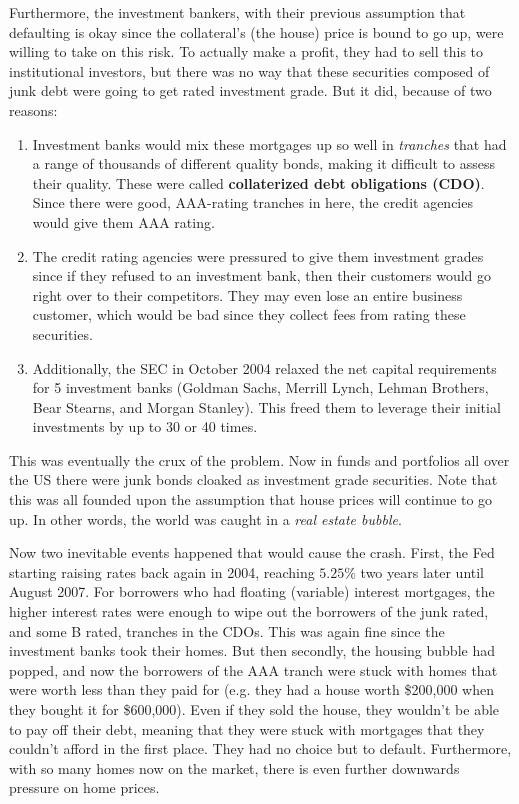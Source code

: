 \documentclass{article}
\begin{document}
  Furthermore, the investment bankers, with their previous assumption that defaulting is okay since the collateral's (the house) price is bound to go up, were willing to take on this risk. To actually make a profit, they had to sell this to institutional investors, but there was no way that these securities composed of junk debt were going to get rated investment grade. But it did, because of two reasons: 
  \begin{enumerate}
    \item Investment banks would mix these mortgages up so well in \textit{tranches} that had a range of thousands of different quality bonds, making it difficult to assess their quality. These were called \textbf{collaterized debt obligations (CDO)}. Since there were good, AAA-rating tranches in here, the credit agencies would give them AAA rating.  
    \item The credit rating agencies were pressured to give them investment grades since if they refused to an investment bank, then their customers would go right over to their competitors. They may even lose an entire business customer, which would be bad since they collect fees from rating these securities. 
    \item Additionally, the SEC in October 2004 relaxed the net capital requirements for 5 investment banks (Goldman Sachs, Merrill Lynch, Lehman Brothers, Bear Stearns, and Morgan Stanley). This freed them to leverage their initial investments by up to 30 or 40 times. 
  \end{enumerate}
  This was eventually the crux of the problem. Now in funds and portfolios all over the US there were junk bonds cloaked as investment grade securities. Note that this was all founded upon the assumption that house prices will continue to go up. In other words, the world was caught in a \textit{real estate bubble}. 

  Now two inevitable events happened that would cause the crash. First, the Fed starting raising rates back again in 2004, reaching $5.25\%$ two years later until August 2007. For borrowers who had floating (variable) interest mortgages, the higher interest rates were enough to wipe out the borrowers of the junk rated, and some B rated, tranches in the CDOs. This was again fine since the investment banks took their homes. But then secondly, the housing bubble had popped, and now the borrowers of the AAA tranch were stuck with homes that were worth less than they paid for (e.g. they had a house worth \$200,000 when they bought it for \$600,000). Even if they sold the house, they wouldn't be able to pay off their debt, meaning that they were stuck with mortgages that they couldn't afford in the first place. They had no choice but to default. Furthermore, with so many homes now on the market, there is even further downwards pressure on home prices. 
\end{document}
